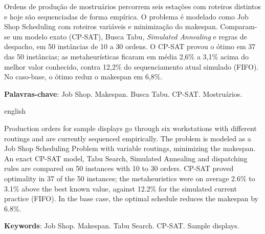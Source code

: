 \begin{resumo}

    Ordens de produção de mostruários percorrem seis estações com roteiros distintos e hoje são sequenciadas de forma empírica. O problema é modelado como Job Shop Scheduling com roteiros variáveis e minimização do makespan. Comparam-se um modelo exato (CP-SAT), Busca Tabu, \textit{Simulated Annealing} e regras de despacho, em 50 instâncias de 10 a 30 ordens. O CP-SAT provou o ótimo em 37 das 50 instâncias; as metaheurísticas ficaram em média 2,6\% a 3,1\% acima do melhor valor conhecido, contra 12,2\% do sequenciamento atual simulado (FIFO). No caso-base, o ótimo reduz o makespan em 6,8\%.
    \vspace{\onelineskip}

    \noindent\textbf{Palavras-chave}: Job Shop. Makespan. Busca Tabu. CP-SAT. Mostruários.

\end{resumo}

\begin{resumo}[Abstract]
\begin{otherlanguage*}{english}

    Production orders for sample displays go through six workstations with different routings and are currently sequenced empirically. The problem is modeled as a Job Shop Scheduling Problem with variable routings, minimizing the makespan. An exact CP-SAT model, Tabu Search, Simulated Annealing and dispatching rules are compared on 50 instances with 10 to 30 orders. CP-SAT proved optimality in 37 of the 50 instances; the metaheuristics were on average 2.6\% to 3.1\% above the best known value, against 12.2\% for the simulated current practice (FIFO). In the base case, the optimal schedule reduces the makespan by 6.8\%.

    \vspace{\onelineskip}

    \noindent\textbf{Keywords}: Job Shop. Makespan. Tabu Search. CP-SAT. Sample displays.
\end{otherlanguage*}
\end{resumo}
